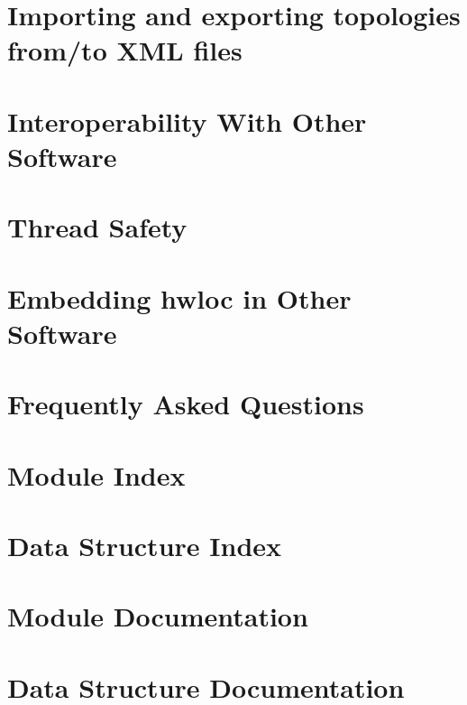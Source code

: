 \documentclass[letterpaper]{book}
\begin{document}
\chapter{Importing and exporting topologies from/to XML files}
\label{xml}
\hypertarget{xml}{}

\chapter{Interoperability With Other Software}
\label{interoperability}
\hypertarget{interoperability}{}

\chapter{Thread Safety}
\label{threadsafety}
\hypertarget{threadsafety}{}

\chapter{Embedding hwloc in Other Software}
\label{embed}
\hypertarget{embed}{}

\chapter{Frequently Asked Questions}
\label{faq}
\hypertarget{faq}{}

\chapter{Module Index}

\chapter{Data Structure Index}

\chapter{Module Documentation}





































\chapter{Data Structure Documentation}















\printindex
\end{document}
